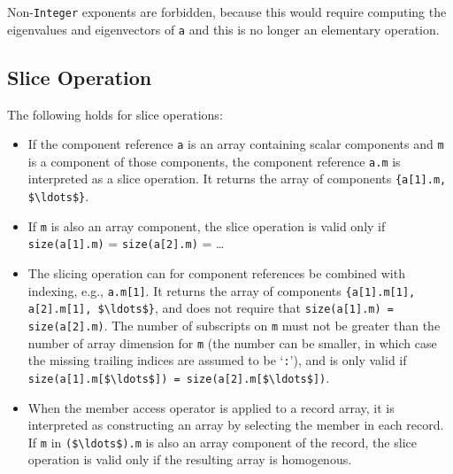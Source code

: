 \begin{nonnormative}
Non-\lstinline!Integer! exponents are forbidden, because this would require computing the eigenvalues and eigenvectors of \lstinline!a! and this is no longer an elementary operation.
\end{nonnormative}

\subsection{Slice Operation}\label{slice-operation}

The following holds for slice operations:
\begin{itemize}
\item
  If the component reference \lstinline!a! is an array containing scalar components and \lstinline!m! is a component of those components, the component reference \lstinline!a.m! is interpreted as a slice operation.
  It returns the array of components \lstinline!{a[1].m, $\ldots$}!.
\item
  If \lstinline!m! is also an array component, the slice operation is valid only if \lstinline!size(a[1].m)! = \lstinline!size(a[2].m)! = \ldots
\item
  The slicing operation can for component references be combined with indexing, e.g., \lstinline!a.m[1]!.
  It returns the array of components \lstinline!{a[1].m[1], a[2].m[1], $\ldots$}!, and does not require that \lstinline!size(a[1].m) = size(a[2].m)!.
  The number of subscripts on \lstinline!m! must not be greater than the number of array dimension for \lstinline!m! (the number can be smaller, in which case the missing trailing indices are assumed to be `\lstinline!:!'), and is only valid if \lstinline!size(a[1].m[$\ldots$]) = size(a[2].m[$\ldots$])!.
\item
  When the member access operator is applied to a record array, it is interpreted as constructing an array by selecting the member in each record.
  If \lstinline!m! in \lstinline!($\ldots$).m! is also an array component of the record, the slice operation is valid only if the resulting array is homogenous.
\end{itemize}

